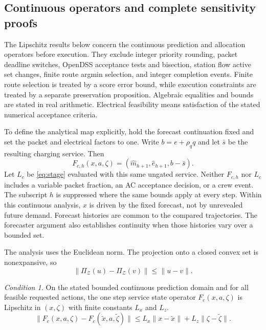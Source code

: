 \subsection{Continuous operators and complete sensitivity proofs}
\label{supp:theory}

The Lipschitz results below concern the continuous prediction and allocation
operators before execution.  They exclude integer priority rounding, packet deadline switches, OpenDSS
acceptance tests and bisection, station flow active set changes, finite route
argmin selection, and integer completion events.  Finite route selection is
treated by a score error bound, while execution constraints are treated by a
separate preservation proposition.  Algebraic equalities and bounds are stated
in real arithmetic.  Electrical feasibility means satisfaction of the stated
numerical acceptance criteria.

To define the analytical map explicitly, hold the forecast continuation fixed
and set the packet and electrical factors to one.  Write
$b=e+\rho_q q$ and let $\bar s$ be the resulting charging service.  Then
\begin{equation}
F_{c,h}(x,a,\zeta)=
(\hat m_{h+1},\hat e_{h+1},b-\bar s).
\label{si:eq:continuous-service}
\end{equation}
Let $L_c$ be \eqref{eq:stage} evaluated with this same ungated service.
Neither $F_{c,h}$ nor $L_c$ includes a variable packet fraction, an AC acceptance
decision, or a crew event.  The subscript $h$ is suppressed where the same
bounds apply at every step.  Within this continuous analysis, $x$ is driven by
the fixed forecast, not by unrevealed future demand.  Forecast histories are common to the compared
trajectories.  The forecaster argument also establishes continuity when those
histories vary over a bounded set.

The analysis uses the Euclidean norm.  The projection onto a closed convex set
is nonexpansive, so
\begin{equation}
\|\Pi_{\mathcal{Z}}(u)-\Pi_{\mathcal{Z}}(v)\|\le \|u-v\|.
\label{si:eq:projection}
\end{equation}

\textit{Condition 1.}  On the stated bounded continuous prediction domain and
for all feasible requested actions, the one step service state operator
$F_c(x,a,\zeta)$ is
Lipschitz in $(x,\zeta)$ with finite constants $L_x$ and $L_z$.
\begin{equation}
\|F_c(x,a,\zeta)-F_c(\tilde x,a,\tilde \zeta)\|
\le L_x\|x-\tilde x\|+L_z\|\zeta-\tilde \zeta\|.
\end{equation}

